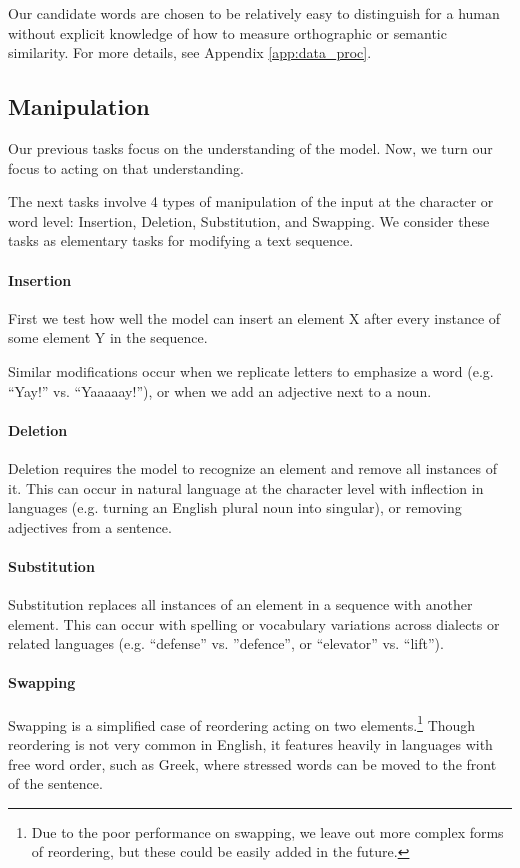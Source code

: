 Our candidate words are chosen to be relatively easy to distinguish for a human without explicit knowledge of how to measure orthographic or semantic similarity. For more details, see Appendix \ref{app:data_proc}.

\subsection{Manipulation}
Our previous tasks focus on the understanding of the model. Now, we turn our focus to acting on that understanding.

The next tasks involve 4 types of manipulation of the input at the character or word level: Insertion, Deletion, Substitution, and Swapping. We consider these tasks as elementary tasks for modifying a text sequence. 

\paragraph{Insertion}
First we test how well the model can insert an element X after every instance of some element Y in the sequence. 

Similar modifications occur when we replicate letters to emphasize a word (e.g. ``Yay!'' vs. ``Yaaaaay!''), or when we add an adjective next to a noun. 

\paragraph{Deletion}
Deletion requires the model to recognize an element and remove all instances of it. This can occur in natural language at the character level with inflection in languages (e.g. turning an English plural noun into singular), or removing adjectives from a sentence. 

\paragraph{Substitution}
Substitution replaces all instances of an element in a sequence with another element. This can occur with spelling or vocabulary variations across dialects or related languages (e.g. ``defense'' vs. ''defence'', or ``elevator'' vs. ``lift'').

\paragraph{Swapping}
Swapping is a simplified case of reordering acting on two elements.\footnote{Due to the poor performance on swapping, we leave out more complex forms of reordering, but these could be easily added in the future.} Though reordering is not very common in English, it features heavily in languages with free word order, such as Greek, where stressed words can be moved to the front of the sentence. 

